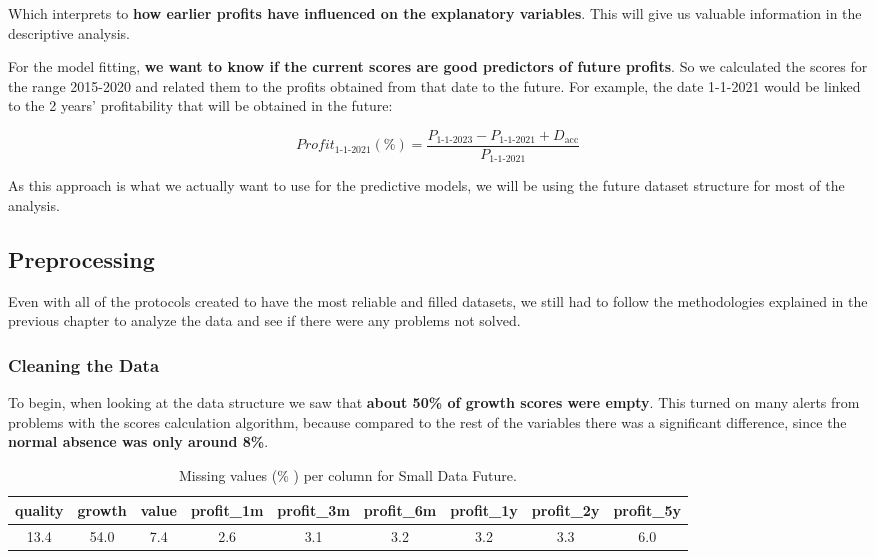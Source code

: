 \documentclass[11pt,english,a4paper,hidelinks]{book}
\begin{document}
\noindent Which interprets to \textbf{how earlier profits have influenced on the explanatory variables}. This will give us valuable information in the descriptive analysis.

\vspace{0.5cm}
\noindent For the model fitting, \textbf{we want to know if the current scores are good predictors of future profits}. So we calculated the scores for the range 2015-2020 and related them to the profits obtained from that date to the future. For example, the date 1-1-2021 would be linked to the 2 years' profitability that will be obtained in the future: 

\begin{equation}
    Profit_{1\text{-}1\text{-}2021}(\%) = \frac{P_{1\text{-}1\text{-}2023} - P_{1\text{-}1\text{-}2021} + D_{\text{acc}}}{P_{1\text{-}1\text{-}2021}}
\end{equation}

\noindent As this approach is what we actually want to use for the predictive models, we will be using the future dataset structure for most of the analysis.

\subsection{Preprocessing}
Even with all of the protocols created to have the most reliable and filled datasets, we still had to follow the methodologies explained in the previous chapter to analyze the data and see if there were any problems not solved.

\subsubsection{Cleaning the Data}
To begin, when looking at the data structure we saw that \textbf{about 50\% of growth scores were empty}. This turned on many alerts from problems with the scores calculation algorithm, because compared to the rest of the variables there was a significant difference, since the \textbf{normal absence was only around 8\%}.
\begin{table}[H]
    \centering
    \begin{tabular}{|c|c|c|c|c|c|c|c|c|}
        \hline
        \textbf{quality} & \textbf{growth} & \textbf{value} & \textbf{profit\_1m} & \textbf{profit\_3m} & \textbf{profit\_6m} & \textbf{profit\_1y} & \textbf{profit\_2y} & \textbf{profit\_5y} \\
        \hline
        13.4 & 54.0 & 7.4 & 2.6 & 3.1 & 3.2 & 3.2 & 3.3 & 6.0 \\
        \hline
    \end{tabular}
    \caption{Missing values (\% ) per column for Small Data Future.}
    \label{tab:missing_values_small_data_future}
\end{table}
\end{document}
